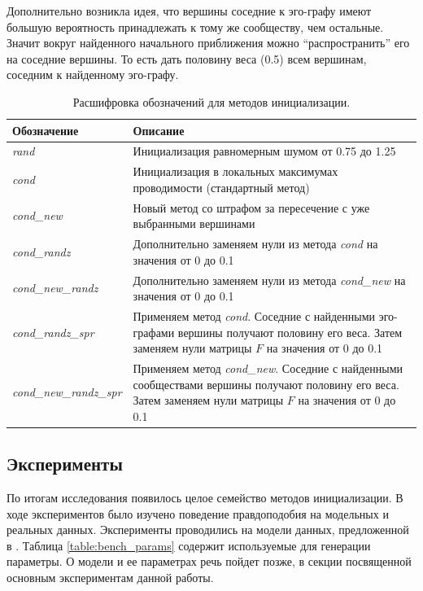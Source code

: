 \documentclass{ITaSconf}
\begin{document}
	Дополнительно возникла идея, что вершины соседние к эго-графу имеют большую вероятность принадлежать к тому же сообществу, чем остальные. 
	Значит вокруг найденного начального приближения можно ``распространить''  его на соседние вершины. 
	То есть дать половину веса (0.5) всем вершинам, соседним к найденному эго-графу.
	\begin{center}
		\begin{table}
			\centering
			\begin{tabular}{ p{9.5em}   p{38em} }
				\hline
				\hline
				\textbf{Обозначение} 		& \textbf{Описание} \\
				\hline
				\textit{rand} 				& Инициализация равномерным шумом от 0.75 до 1.25 \\
				\textit{cond} 				& Инициализация в локальных максимумах проводимости (стандартный метод) \\
				\textit{cond\_new} 			& Новый метод со штрафом за пересечение с уже выбранными вершинами \\
				\textit{cond\_randz} 		& Дополнительно заменяем нули из метода \textit{cond} на значения от 0 до 0.1 \\
				\textit{cond\_new\_randz} 	& Дополнительно заменяем нули из метода \textit{cond\_new} на значения от 0 до 0.1 \\
				\textit{cond\_randz\_spr} 	& Применяем метод \textit{cond}. Соседние с найденными эго-графами вершины получают половину его веса. Затем заменяем нули матрицы $F$ на значения от 0 до 0.1 \\
				\textit{cond\_new\_randz\_spr} & Применяем метод \textit{cond\_new}. Соседние с найденными сообществами вершины получают половину его веса. Затем заменяем нули матрицы $F$ на значения от 0 до 0.1 \\
				\hline
				\hline
			\end{tabular}
			\caption{Расшифровка обозначений для методов инициализации.}
			\label{table:init_methods}
		\end{table}
	\end{center}
	\subsection{Эксперименты} 
	
	По итогам исследования появилось целое семейство методов инициализации. 
	В ходе экспериментов было изучено поведение правдоподобия на модельных и реальных данных. 
	Эксперименты проводились на модели данных, предложенной в \cite{lancichinetti2009benchmarks}. 
	Таблица \ref{table:bench_params} содержит используемые для генерации параметры. 
	О модели и ее параметрах речь пойдет позже, в секции посвященной основным экспериментам данной работы.
	
\end{document}
